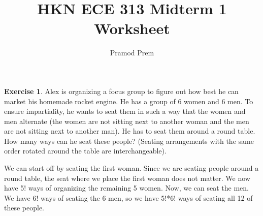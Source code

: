 \documentclass[12pt]{amsart}
\title{HKN ECE 313 Midterm 1 Worksheet}
\author{Pramod Prem}
\theoremstyle{definition}
\newtheorem{exercise}{Exercise}
\numberwithin{equation}{section}
\theoremstyle{plain}
\begin{document}
\maketitle

\begin{exercise}
Alex is organizing a focus group to figure out how best he can market his homemade rocket engine. He has a group of 6 women and 6 men. To ensure impartiality, he wants to seat them in such a way that the women and men alternate (the women are not sitting next to another woman and the men are not sitting next to another man). He has to seat them around a round table. How many ways can he seat these people? (Seating arrangements with the same order rotated around the table are interchangeable).
\begin{answer}We can start off by seating the first woman. Since we are seating people around a round table, the seat where we place the first woman does not matter. We now have 5! ways of organizing the remaining 5 women. Now, we can seat the men. We have 6! ways of seating the 6 men, so we have 5!*6! ways of seating all 12 of these people.
\end{answer}
\end{exercise}
\end{document}
